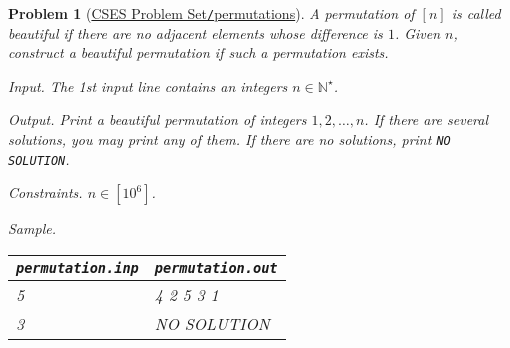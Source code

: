 \documentclass{article}
\newtheorem{problem}{Problem}
\begin{document}
\begin{problem}[\href{https://cses.fi/problemset/task/1070}{CSES Problem Set{\tt/}permutations}]
    A permutation of $[n]$ is called {\rm beautiful} if there are no adjacent elements whose difference is $1$. Given $n$, construct a beautiful permutation if such a permutation exists.
    \item {\sf Input.} The 1st input line contains an integers $n\in\mathbb{N}^\star$.
    \item {\sf Output.} Print a beautiful permutation of integers $1,2,\ldots,n$. If there are several solutions, you may print any of them. If there are no solutions, print {\tt NO SOLUTION}.
    \item {\sf Constraints.} $n\in[10^6]$.
    \item {\sf Sample.}
    \begin{table}[H]
        \centering
        \begin{tabular}{|l|l|}
            \hline
            \verb|permutation.inp| & \verb|permutation.out| \\
            \hline
            5 & 4 2 5 3 1 \\
            \hline
            3 & NO SOLUTION \\
            \hline
        \end{tabular}
    \end{table}
\end{problem}
\end{document}
